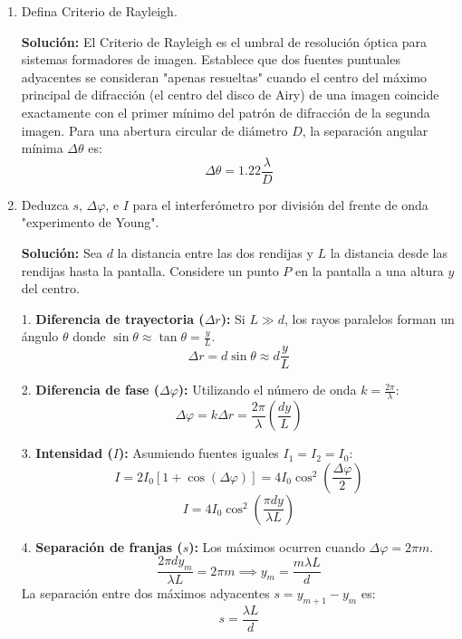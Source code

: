 \documentclass[12pt, letterpaper]{article}
\begin{document}
\begin{enumerate}
		\textbf{Solución:}
		La condición para los mínimos de difracción de una sola rendija está dada por la ecuación:
		$$ a \sin\theta = m\lambda $$
		Para el primer mínimo, $m = 1$. Despejando el ancho de la rendija $a$:
		$$ a = \frac{1 \cdot \lambda}{\sin\theta} $$
		Sustituyendo $\lambda = 650 \times 10^{-9}\text{ m}$ y $\theta = 15^{\circ}$:
		$$ a = \frac{650 \times 10^{-9}\text{ m}}{\sin(15^{\circ})} = \frac{650 \times 10^{-9}\text{ m}}{0.258819} \approx 2.51 \times 10^{-6}\text{ m} $$
		El ancho de la rendija es $a \approx 2.51 \, \mu\text{m}$.
		
		\item Defina Criterio de Rayleigh.
		
		\textbf{Solución:}
		El Criterio de Rayleigh es el umbral de resolución óptica para sistemas formadores de imagen. Establece que dos fuentes puntuales adyacentes se consideran "apenas resueltas" cuando el centro del máximo principal de difracción (el centro del disco de Airy) de una imagen coincide exactamente con el primer mínimo del patrón de difracción de la segunda imagen. 
		Para una abertura circular de diámetro $D$, la separación angular mínima $\Delta\theta$ es:
		$$ \Delta\theta = 1.22 \frac{\lambda}{D} $$
		
		\item Deduzca $s$, $\Delta\varphi$, e $I$ para el interferómetro por división del frente de onda "experimento de Young". 
		
		\textbf{Solución:}
		Sea $d$ la distancia entre las dos rendijas y $L$ la distancia desde las rendijas hasta la pantalla. Considere un punto $P$ en la pantalla a una altura $y$ del centro.
		
		1. \textbf{Diferencia de trayectoria ($\Delta r$):} Si $L \gg d$, los rayos paralelos forman un ángulo $\theta$ donde $\sin\theta \approx \tan\theta = \frac{y}{L}$.
		$$ \Delta r = d \sin\theta \approx d \frac{y}{L} $$
		
		2. \textbf{Diferencia de fase ($\Delta\varphi$):} Utilizando el número de onda $k = \frac{2\pi}{\lambda}$:
		$$ \Delta\varphi = k\Delta r = \frac{2\pi}{\lambda} \left( \frac{dy}{L} \right) $$
		
		3. \textbf{Intensidad ($I$):} Asumiendo fuentes iguales $I_1 = I_2 = I_0$:
		$$ I = 2I_0 [1 + \cos(\Delta\varphi)] = 4I_0 \cos^2\left(\frac{\Delta\varphi}{2}\right) $$
		$$ I = 4I_0 \cos^2\left( \frac{\pi d y}{\lambda L} \right) $$
		
		4. \textbf{Separación de franjas ($s$):} Los máximos ocurren cuando $\Delta\varphi = 2\pi m$.
		$$ \frac{2\pi d y_m}{\lambda L} = 2\pi m \implies y_m = \frac{m\lambda L}{d} $$
		La separación entre dos máximos adyacentes $s = y_{m+1} - y_m$ es:
		$$ s = \frac{\lambda L}{d} $$
		

\end{enumerate}
\end{document}
